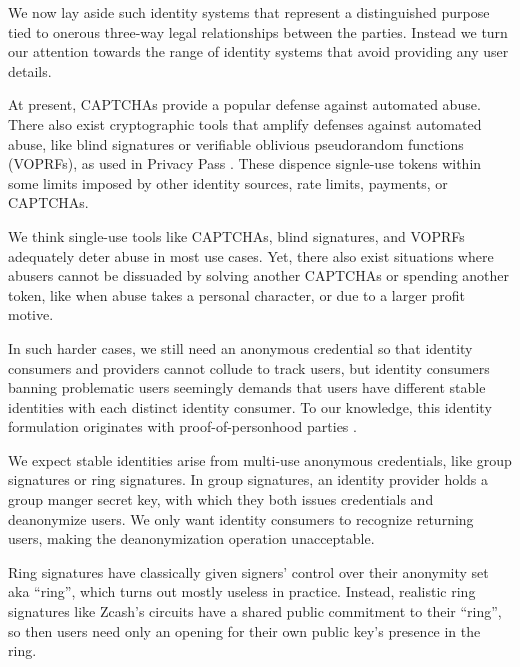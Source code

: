 We now lay aside such identity systems that represent a distinguished purpose tied to onerous three-way legal relationships between the parties.  Instead we turn our attention towards the range of identity systems that avoid providing any user details.  

At present, CAPTCHAs provide a popular defense against automated abuse.  There also exist cryptographic tools that amplify defenses against automated abuse, like blind signatures or verifiable oblivious pseudorandom functions (VOPRFs), as used in Privacy Pass \cite{privacypass}.  These dispence signle-use tokens within some limits imposed by other identity sources, rate limits, payments, or CAPTCHAs.  

We think single-use tools like CAPTCHAs, blind signatures, and VOPRFs adequately deter abuse in most use cases.  Yet, there also exist situations where abusers cannot be dissuaded by solving another CAPTCHAs or spending another token, like when abuse takes a personal character, or due to a larger profit motive.  

In such harder cases, we still need an anonymous credential so that identity consumers and providers cannot collude to track users, but identity consumers banning problematic users seemingly demands that users have different stable identities with each distinct identity consumer.  
To our knowledge, this identity formulation originates with proof-of-personhood parties \cite{pop2008,pop2017}.

We expect stable identities arise from multi-use anonymous credentials, like group signatures or ring signatures.  In group signatures, an identity provider holds a group manger secret key, with which they both issues credentials and deanonymize users.  We only want identity consumers to recognize returning users, making the deanonymization operation unacceptable.  

Ring signatures have classically given signers' control over their anonymity set aka ``ring'', which turns out mostly useless in practice.  Instead, realistic ring signatures like Zcash's circuits \cite{zcash_prorocol} have a shared public commitment to their ``ring'', so then users need only an opening for their own public key's presence in the ring. 






